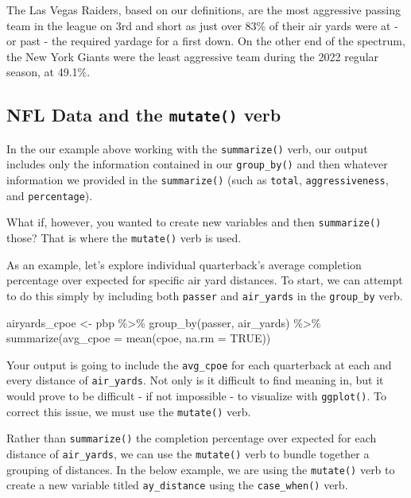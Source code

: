\documentclass[
  letterpaper,
]{krantz}
\newenvironment{Shaded}{\begin{snugshade}}{\end{snugshade}}
\newcommand{\AttributeTok}[1]{\textcolor[rgb]{0.40,0.45,0.13}{#1}}
\newcommand{\ConstantTok}[1]{\textcolor[rgb]{0.56,0.35,0.01}{#1}}
\newcommand{\FunctionTok}[1]{\textcolor[rgb]{0.28,0.35,0.67}{#1}}
\newcommand{\NormalTok}[1]{\textcolor[rgb]{0.00,0.23,0.31}{#1}}
\newcommand{\OtherTok}[1]{\textcolor[rgb]{0.00,0.23,0.31}{#1}}
\newcommand{\SpecialCharTok}[1]{\textcolor[rgb]{0.37,0.37,0.37}{#1}}
\begin{document}
The Las Vegas Raiders, based on our definitions, are the most aggressive
passing team in the league on 3rd and short as just over 83\% of their
air yards were at - or past - the required yardage for a first down. On
the other end of the spectrum, the New York Giants were the least
aggressive team during the 2022 regular season, at 49.1\%.

\hypertarget{nfl-data-and-the-mutate-verb}{%
\subsection{\texorpdfstring{NFL Data and the \texttt{mutate()}
verb}{NFL Data and the mutate() verb}}\label{nfl-data-and-the-mutate-verb}}

In the our example above working with the \texttt{summarize()} verb, our
output includes only the information contained in our
\texttt{group\_by()} and then whatever information we provided in the
\texttt{summarize()} (such as \texttt{total}, \texttt{aggressiveness},
and \texttt{percentage}).

What if, however, you wanted to create new variables and then
\texttt{summarize()} those? That is where the \texttt{mutate()} verb is
used.

As an example, let's explore individual quarterback's average completion
percentage over expected for specific air yard distances. To start, we
can attempt to do this simply by including both \texttt{passer} and
\texttt{air\_yards} in the \texttt{group\_by} verb.

\begin{Shaded}
\begin{Highlighting}[]
\NormalTok{airyards\_cpoe }\OtherTok{\textless{}{-}}\NormalTok{ pbp }\SpecialCharTok{\%\textgreater{}\%}
  \FunctionTok{group\_by}\NormalTok{(passer, air\_yards) }\SpecialCharTok{\%\textgreater{}\%}
  \FunctionTok{summarize}\NormalTok{(}\AttributeTok{avg\_cpoe =} \FunctionTok{mean}\NormalTok{(cpoe, }\AttributeTok{na.rm =} \ConstantTok{TRUE}\NormalTok{))}
\end{Highlighting}
\end{Shaded}

Your output is going to include the \texttt{avg\_cpoe} for each
quarterback at each and every distance of \texttt{air\_yards}. Not only
is it difficult to find meaning in, but it would prove to be difficult -
if not impossible - to visualize with \texttt{ggplot()}. To correct this
issue, we must use the \texttt{mutate()} verb.

Rather than \texttt{summarize()} the completion percentage over expected
for each distance of \texttt{air\_yards}, we can use the
\texttt{mutate()} verb to bundle together a grouping of distances. In
the below example, we are using the \texttt{mutate()} verb to create a
new variable titled \texttt{ay\_distance} using the
\texttt{case\_when()} verb.
\end{document}
